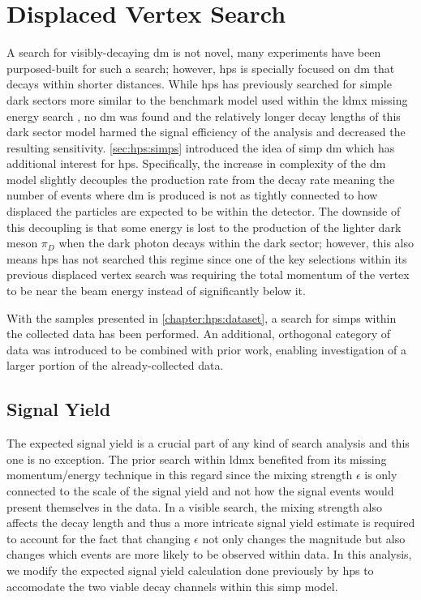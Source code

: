 \chapter{Displaced Vertex Search}
\label{chapter:hps:analysis}

A search for visibly-decaying \ac{dm} is not novel, many experiments have been purposed-built
for such a search; however, \ac{hps} is specially focused on \ac{dm} that decays
within shorter distances.
While \ac{hps} has previously searched for simple dark sectors
more similar to the benchmark model used within the \ac{ldmx} missing energy search \cite{hps-2016-displaced-vtx},
no \ac{dm} was found and the relatively longer decay lengths of this dark sector model
harmed the signal efficiency of the analysis and decreased the resulting sensitivity.
\cref{sec:hps:simps} introduced the idea of \ac{simp} \ac{dm} which has additional
interest for \ac{hps}.
Specifically, the increase in complexity of the \ac{dm} model slightly decouples the production
rate from the decay rate meaning the number of events where \ac{dm} is produced is not as tightly
connected to how displaced the particles are expected to be within the detector.
The downside of this decoupling is that some energy is lost to the production of the lighter
dark meson $\pi_D$ when the dark photon decays within the dark sector; however,
this also means \ac{hps} has not searched this regime since one of the key selections within
its previous displaced vertex search was requiring the total momentum of the vertex to be
near the beam energy instead of significantly below it.

With the samples presented in \cref{chapter:hps:dataset}, a search for \acp{simp} within the collected
data has been performed.
An additional, orthogonal category of data was introduced to be combined with prior work,
enabling investigation of a larger portion of the already-collected data.

\section{Signal Yield}
\label{sec:hps:signal-yield}

The expected signal yield is a crucial part of any kind of search analysis
and this one is no exception.
The prior search within \ac{ldmx} benefited from its missing momentum/energy technique
in this regard since the mixing strength $\epsilon$ is only connected to the scale of the signal
yield and not how the signal events would present themselves in the data.
In a visible search, the mixing strength also affects the decay length and thus a more intricate
signal yield estimate is required to account for the fact that changing $\epsilon$ not only changes
the magnitude but also changes which events are more likely to be observed within data.
In this analysis, we modify the expected signal yield calculation done previously by \ac{hps}
\cite{hps-2016-displaced-vtx} to accomodate the two viable decay channels within this \ac{simp} model.

